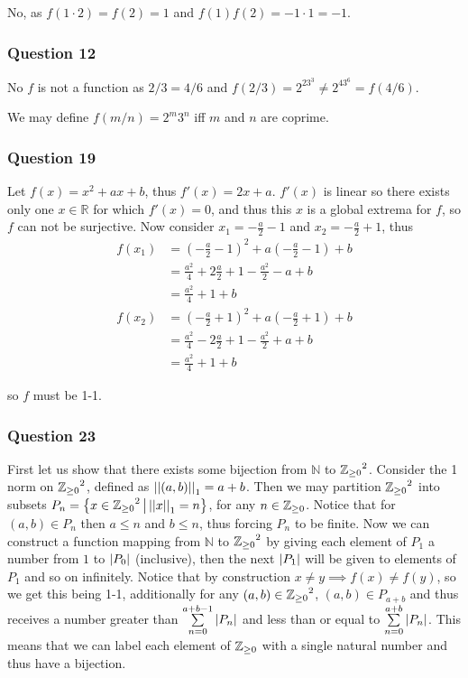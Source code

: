 \documentclass{article}
\begin{document}
 No, as $f(1\cdot 2) = f(2) = 1$ and $f(1)f(2) = -1 \cdot 1 = -1$.

\subsubsection{Question 12}

 No $f$ is not a function as $2/3 = 4/6$ and $f(2/3) = 2^23^3 \not= 2^43^6 = f(4/6)$.

 We may define $f(m/n) = 2^m3^n$ iff $m$ and $n$ are coprime.

\subsubsection{Question 19}

Let $f(x) = x^2+ax+b$, thus $f'(x) = 2x+a$. $f'(x)$ is linear so there exists only one $x\in\mathbb R$ for which $f'(x) = 0$, and thus this $x$ is a global extrema for $f$, so $f$ can not be surjective. Now consider $x_1 = -\frac a2-1$ and $x_2=-\frac a2+1$, thus
\begin{align*}
f(x_1) &= \left(-\frac a2-1\right)^2+a\left(-\frac a2-1\right)+b \\
&= \frac{a^2}4+2\frac a2+1-\frac{a^2}2-a+b\\
&=\frac{a^2}4+1+b\\
f(x_2) &= \left(-\frac a2+1\right)^2+a\left(-\frac a2+1\right)+b \\
&= \frac{a^2}4-2\frac a2+1-\frac{a^2}2+a+b\\
&= \frac{a^2}4+1+b
\end{align*}

so $f$ must be 1-1.

\subsubsection{Question 23}


\def\RB{}
\def\LB{}

First let us show that there exists some bijection from $\mathbb N$ to ${\mathbb Z_{\ge 0}}^2$. Consider the 1 norm on ${\mathbb Z_{\ge 0}}^2$, defined as $\left|\left|{(a,b)}\right|\right|_1 = a + b$. Then we may partition ${\mathbb Z_{\ge 0}}^2$ into subsets $P_n = \left\{{x\in{\mathbb Z_{\ge 0}}^2} \,\middle|\, {\left|\left|{x}\right|\right|_1 = n}\right\}$, for any $n\in {\mathbb Z_{\ge 0}}$. Notice that for $(a,b)\in P_n$ then $a \le n$ and $b \le n$, thus forcing $P_n$ to be finite. Now we can construct a function mapping from $\mathbb N$ to ${\mathbb Z_{\ge 0}}^2$ by giving each element of $P_1$ a number from $1$ to $\left| {P_0} \right|$ (inclusive), then the next $\left| {P_1} \right|$ will be given to elements of $P_1$ and so on infinitely. Notice that by construction $x\not= y \implies f(x) \not= f(y)$, so we get this being 1-1, additionally for any $(a,b) \in {\mathbb Z_{\ge 0}}^2$, $(a,b)\in P_{a+b}$ and thus receives a number greater than $\sumfrom{n=0}{a+b-1}{\card{P_n}}$ and less than or equal to $\sumfrom{n=0}{a+b}{\card{P_n}}$. This means that we can label each element of ${\mathbb Z_{\ge 0}}$ with a single natural number and thus have a bijection.
\end{document}
